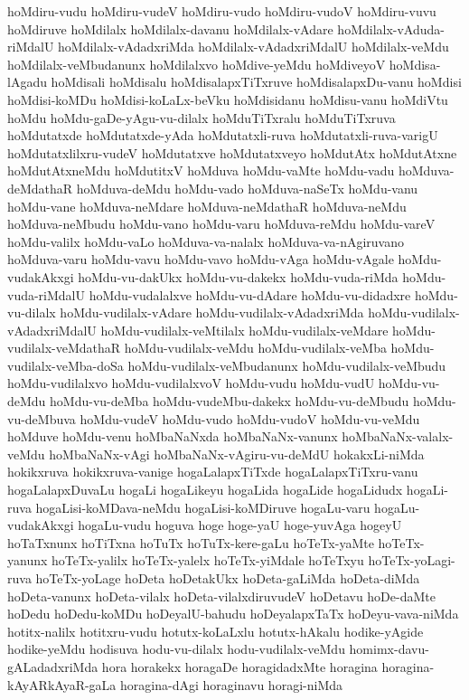 {hoMdiru-vudu
hoMdiru-vudeV
hoMdiru-vudo
hoMdiru-vudoV
hoMdiru-vuvu
hoMdiruve
hoMdilalx
hoMdilalx-davanu
hoMdilalx-vAdare
hoMdilalx-vAduda-riMdalU
hoMdilalx-vAdadxriMda
hoMdilalx-vAdadxriMdalU
hoMdilalx-veMdu
hoMdilalx-veMbudanunx
hoMdilalxvo
hoMdive-yeMdu
hoMdiveyoV
hoMdisa-lAgadu
hoMdisali
hoMdisalu
hoMdisalapxTiTxruve
hoMdisalapxDu-vanu
hoMdisi
hoMdisi-koMDu
hoMdisi-koLaLx-beVku
hoMdisidanu
hoMdisu-vanu
hoMdiVtu
hoMdu
hoMdu-gaDe-yAgu-vu-dilalx
hoMduTiTxralu
hoMduTiTxruva
hoMdutatxde
hoMdutatxde-yAda
hoMdutatxli-ruva
hoMdutatxli-ruva-varigU
hoMdutatxlilxru-vudeV
hoMdutatxve
hoMdutatxveyo
hoMdutAtx
hoMdutAtxne
hoMdutAtxneMdu
hoMdutitxV
hoMduva
hoMdu-vaMte
hoMdu-vadu
hoMduva-deMdathaR
hoMduva-deMdu
hoMdu-vado
hoMduva-naSeTx
hoMdu-vanu
hoMdu-vane
hoMduva-neMdare
hoMduva-neMdathaR
hoMduva-neMdu
hoMduva-neMbudu
hoMdu-vano
hoMdu-varu
hoMduva-reMdu
hoMdu-vareV
hoMdu-valilx
hoMdu-vaLo
hoMduva-va-nalalx
hoMduva-va-nAgiruvano
hoMduva-varu
hoMdu-vavu
hoMdu-vavo
hoMdu-vAga
hoMdu-vAgale
hoMdu-vudakAkxgi
hoMdu-vu-dakUkx
hoMdu-vu-dakekx
hoMdu-vuda-riMda
hoMdu-vuda-riMdalU
hoMdu-vudalalxve
hoMdu-vu-dAdare
hoMdu-vu-didadxre
hoMdu-vu-dilalx
hoMdu-vudilalx-vAdare
hoMdu-vudilalx-vAdadxriMda
hoMdu-vudilalx-vAdadxriMdalU
hoMdu-vudilalx-veMtilalx
hoMdu-vudilalx-veMdare
hoMdu-vudilalx-veMdathaR
hoMdu-vudilalx-veMdu
hoMdu-vudilalx-veMba
hoMdu-vudilalx-veMba-doSa
hoMdu-vudilalx-veMbudanunx
hoMdu-vudilalx-veMbudu
hoMdu-vudilalxvo
hoMdu-vudilalxvoV
hoMdu-vudu
hoMdu-vudU
hoMdu-vu-deMdu
hoMdu-vu-deMba
hoMdu-vudeMbu-dakekx
hoMdu-vu-deMbudu
hoMdu-vu-deMbuva
hoMdu-vudeV
hoMdu-vudo
hoMdu-vudoV
hoMdu-vu-veMdu
hoMduve
hoMdu-venu
hoMbaNaNxda
hoMbaNaNx-vanunx
hoMbaNaNx-valalx-veMdu
hoMbaNaNx-vAgi
hoMbaNaNx-vAgiru-vu-deMdU
hokakxLi-niMda
hokikxruva
hokikxruva-vanige
hogaLalapxTiTxde
hogaLalapxTiTxru-vanu
hogaLalapxDuvaLu
hogaLi
hogaLikeyu
hogaLida
hogaLide
hogaLidudx
hogaLi-ruva
hogaLisi-koMDava-neMdu
hogaLisi-koMDiruve
hogaLu-varu
hogaLu-vudakAkxgi
hogaLu-vudu
hoguva
hoge
hoge-yaU
hoge-yuvAga
hogeyU
hoTaTxnunx
hoTiTxna
hoTuTx
hoTuTx-kere-gaLu
hoTeTx-yaMte
hoTeTx-yanunx
hoTeTx-yalilx
hoTeTx-yalelx
hoTeTx-yiMdale
hoTeTxyu
hoTeTx-yoLagi-ruva
hoTeTx-yoLage
hoDeta
hoDetakUkx
hoDeta-gaLiMda
hoDeta-diMda
hoDeta-vanunx
hoDeta-vilalx
hoDeta-vilalxdiruvudeV
hoDetavu
hoDe-daMte
hoDedu
hoDedu-koMDu
hoDeyalU-bahudu
hoDeyalapxTaTx
hoDeyu-vava-niMda
hotitx-nalilx
hotitxru-vudu
hotutx-koLaLxlu
hotutx-hAkalu
hodike-yAgide
hodike-yeMdu
hodisuva
hodu-vu-dilalx
hodu-vudilalx-veMdu
homimx-davu-gALadadxriMda
hora
horakekx
horagaDe
horagidadxMte
horagina
horagina-kAyARkAyaR-gaLa
horagina-dAgi
horaginavu
horagi-niMda
}
